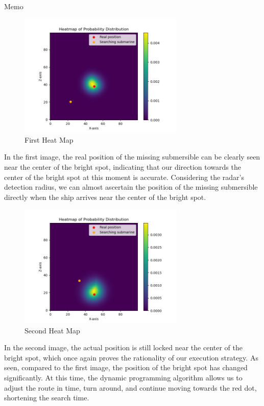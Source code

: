 \documentclass[12pt]{article}
\begin{document}
\begin{letter}{Memo}
\begin{figure}[H]
\centering
\includegraphics[width=0.7\textwidth]{memofirst.png}
\caption{First Heat Map}
\end{figure}
In the first image, the real position of the missing submersible can be clearly seen near the center of the bright spot, indicating that our direction towards the center of the bright spot at this moment is accurate. Considering the radar's detection radius, we can almost ascertain the position of the missing submersible directly when the ship arrives near the center of the bright spot.

\begin{figure}[H]
\centering
\includegraphics[width=0.7\textwidth]{memosecond.png}
\caption{Second Heat Map}
\end{figure}
In the second image, the actual position is still locked near the center of the bright spot, which once again proves the rationality of our execution strategy. As seen, compared to the first image, the position of the bright spot has changed significantly. At this time, the dynamic programming algorithm allows us to adjust the route in time, turn around, and continue moving towards the red dot, shortening the search time.


\end{letter}
\end{document}
